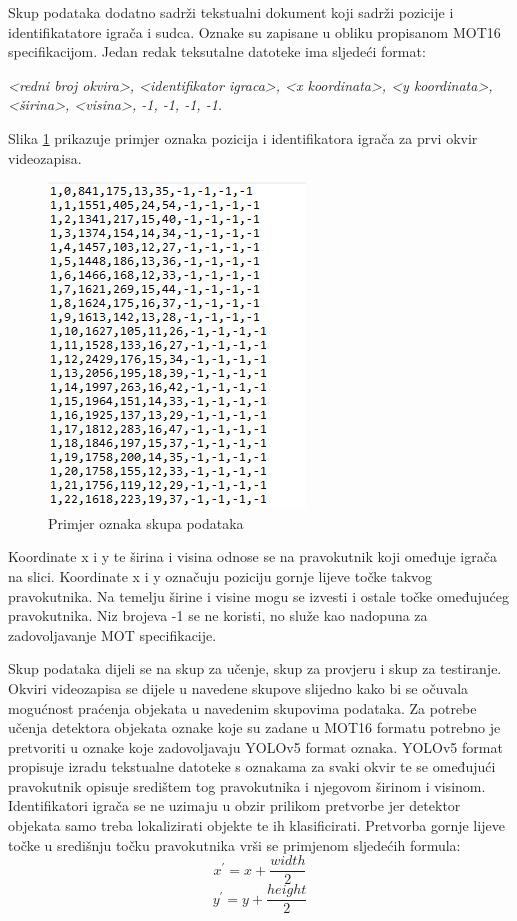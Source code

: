 \documentclass[times, utf8, seminar, numeric]{fer}
\begin{document}
Skup podataka dodatno sadrži tekstualni dokument koji sadrži pozicije i identifikatatore igrača i sudca. Oznake su zapisane u obliku propisanom MOT16 specifikacijom. Jedan redak teksutalne datoteke ima sljedeći format:

\textit{<redni broj okvira>, <identifikator igraca>, <x koordinata>, <y koordinata>, <širina>, <visina>, -1, -1, -1, -1.}

Slika \ref{fig:oznake} prikazuje primjer oznaka pozicija i identifikatora igrača za prvi okvir videozapisa.

\begin{figure}
	\centering
	\includegraphics[scale=0.8]{slike/oznake.png}
	\caption {Primjer oznaka skupa podataka}
	\label{fig:oznake}	
\end{figure}



Koordinate x i y te širina i visina odnose se na pravokutnik koji omeđuje igrača na slici. Koordinate x i y označuju poziciju gornje lijeve točke takvog pravokutnika. Na temelju širine i visine mogu se izvesti i ostale točke omeđujućeg pravokutnika.
Niz brojeva -1 se ne koristi, no služe kao nadopuna za zadovoljavanje MOT specifikacije.

Skup podataka dijeli se na skup za učenje, skup za provjeru i skup za testiranje. 
Okviri videozapisa se dijele u navedene skupove slijedno kako bi se očuvala mogućnost praćenja objekata u navedenim skupovima podataka. 
Za potrebe učenja detektora objekata oznake koje su zadane u MOT16 formatu potrebno je pretvoriti u oznake koje zadovoljavaju YOLOv5 format oznaka. YOLOv5 format propisuje izradu tekstualne datoteke s oznakama za svaki okvir te se omeđujući pravokutnik opisuje središtem tog pravokutnika i njegovom širinom i visinom. Identifikatori igrača se ne uzimaju u obzir prilikom pretvorbe jer detektor objekata samo treba lokalizirati objekte te ih klasificirati. Pretvorba gornje lijeve točke u središnju točku pravokutnika vrši se primjenom sljedećih formula:
\[x^{'} = x + \frac{width}{2}\] 
\[y^{'} = y + \frac{height}{2}\] 
\end{document}
